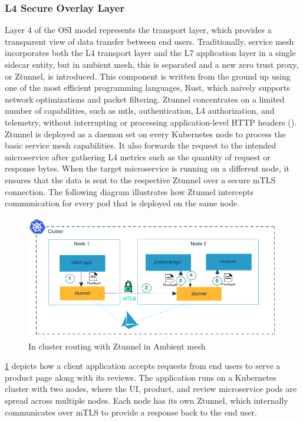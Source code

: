 \subsubsection{L4 Secure Overlay Layer}
Layer 4 of the OSI model represents the transport layer, which provides a transparent view of data transfer between end users. Traditionally, service mesh incorporates both the L4 transport layer and the L7 application layer in a single sidecar entity, but in ambient mesh, this is separated and a new zero trust proxy, or Ztunnel, is introduced. This component is written from the ground up using one of the most efficient programming languages, Rust, which naively supports network optimizations and packet filtering. Ztunnel concentrates on a limited number of capabilities, such as \acrshort{mtls}, authentication, L4 authorization, and telemetry, without interrupting or processing application-level HTTP headers (\cite{istioSun2023}). Ztunnel is deployed as a daemon set on every Kubernetes node to process the basic service mesh capabilities. It also forwards the request to the intended microservice after gathering L4 metrics such as the quantity of request or response bytes. When the target microservice is running on a different node, it ensures that the data is sent to the respective Ztunnel over a secure mTLS connection. The following diagram illustrates how Ztunnel intercepts communication for every pod that is deployed on the same node.

\begin{figure}[ht!]
  \centering
  \includegraphics[width=0.7\linewidth]{resources/ambient-routing-l4.png}
  \caption{In cluster routing with Ztunnel in Ambient mesh}
  \label{lr:ztunnelDesign}
\end{figure}

\ref{lr:ztunnelDesign} depicts how a client application accepts requests from end users to serve a product page along with its reviews. The application runs on a Kubernetes cluster with two nodes, where the UI, product, and review microservice pods are spread across multiple nodes. Each node has its own Ztunnel, which internally communicates over mTLS to provide a response back to the end user.

